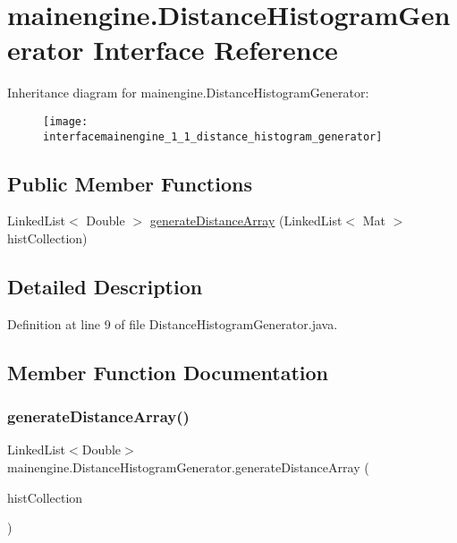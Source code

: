 \hypertarget{interfacemainengine_1_1_distance_histogram_generator}{}\section{mainengine.\+Distance\+Histogram\+Generator Interface Reference}
\label{interfacemainengine_1_1_distance_histogram_generator}
Inheritance diagram for mainengine.\+Distance\+Histogram\+Generator\+:\begin{figure}[H]
\begin{center}
\leavevmode
\texttt{[image: interfacemainengine\_1\_1\_distance\_histogram\_generator]}
\end{center}
\end{figure}
\subsection*{Public Member Functions}
\begin{DoxyCompactItemize}
\item 
Linked\+List$<$ Double $>$ \hyperlink{interfacemainengine_1_1_distance_histogram_generator_aae0fe15938495eb06c17644291eb099a}{generate\+Distance\+Array} (Linked\+List$<$ Mat $>$ hist\+Collection)
\end{DoxyCompactItemize}


\subsection{Detailed Description}


Definition at line 9 of file Distance\+Histogram\+Generator.\+java.



\subsection{Member Function Documentation}
\hypertarget{interfacemainengine_1_1_distance_histogram_generator_aae0fe15938495eb06c17644291eb099a}{}\label{interfacemainengine_1_1_distance_histogram_generator_aae0fe15938495eb06c17644291eb099a} 
\subsubsection{\texorpdfstring{generate\+Distance\+Array()}{generateDistanceArray()}}
{\footnotesize\ttfamily Linked\+List$<$Double$>$ mainengine.\+Distance\+Histogram\+Generator.\+generate\+Distance\+Array (\begin{DoxyParamCaption}\item[{Linked\+List$<$ Mat $>$}]{hist\+Collection }\end{DoxyParamCaption})}



